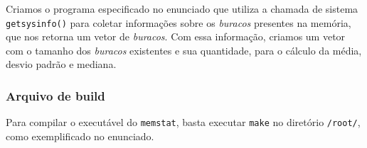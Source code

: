 \documentclass[]{article}
\begin{document}
Criamos o programa especificado no enunciado que utiliza a chamada de
sistema \texttt{getsysinfo()} para coletar informações sobre os
\emph{buracos} presentes na memória, que nos retorna um vetor de
\emph{buracos}. Com essa informação, criamos um vetor com o tamanho dos
\emph{buracos} existentes e sua quantidade, para o cálculo da média,
desvio padrão e mediana.

\hypertarget{arquivo-de-build}{%
\subsubsection{Arquivo de build}\label{arquivo-de-build}}

Para compilar o executável do \texttt{memstat}, basta executar
\texttt{make} no diretório \texttt{/root/}, como exemplificado no
enunciado.
\end{document}
